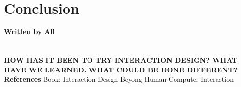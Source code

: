 \chapter{Conclusion}
\textbf{Written by All}\\
\\ \\ \textbf{HOW HAS IT BEEN TO TRY INTERACTION DESIGN? WHAT HAVE WE LEARNED. WHAT COULD BE DONE DIFFERENT?}
\textbf{References}
Book: Interaction Design Beyong Human Computer Interaction

